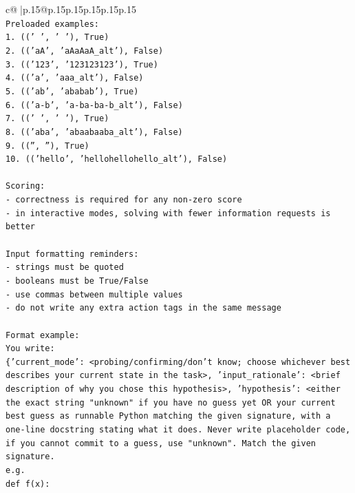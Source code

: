 \documentclass{article}
\begin{document}
{\begin{supertabular}{c@{$\;$}|p{.15\linewidth}@{}p{.15\linewidth}p{.15\linewidth}p{.15\linewidth}p{.15\linewidth}p{.15\linewidth}}
{{{\\ 
\texttt{Preloaded examples:} \\
\texttt{1. (('   ', '         '), True)} \\
\texttt{2. (('aA', 'aAaAaA\_alt'), False)} \\
\texttt{3. (('123', '123123123'), True)} \\
\texttt{4. (('a', 'aaa\_alt'), False)} \\
\texttt{5. (('ab', 'ababab'), True)} \\
\texttt{6. (('a{-}b', 'a{-}ba{-}ba{-}b\_alt'), False)} \\
\texttt{7. ((' ', '   '), True)} \\
\texttt{8. (('aba', 'abaabaaba\_alt'), False)} \\
\texttt{9. (('', ''), True)} \\
\texttt{10. (('hello', 'hellohellohello\_alt'), False)} \\
\\ 
\texttt{Scoring:} \\
\texttt{{-} correctness is required for any non{-}zero score} \\
\texttt{{-} in interactive modes, solving with fewer information requests is better} \\
\\ 
\texttt{Input formatting reminders:} \\
\texttt{{-} strings must be quoted} \\
\texttt{{-} booleans must be True/False} \\
\texttt{{-} use commas between multiple values} \\
\texttt{{-} do not write any extra action tags in the same message} \\
\\ 
\texttt{Format example:} \\
\texttt{You write:} \\
\texttt{\{'current\_mode': <probing/confirming/don't know; choose whichever best describes your current state in the task>, 'input\_rationale': <brief description of why you chose this hypothesis>, 'hypothesis': <either the exact string "unknown" if you have no guess yet OR your current best guess as runnable Python matching the given signature, with a one{-}line docstring stating what it does. Never write placeholder code, if you cannot commit to a guess, use "unknown". Match the given signature.} \\
\texttt{e.g.} \\
\texttt{def f(x):} \\
}}}
\end{supertabular}}
\end{document}
